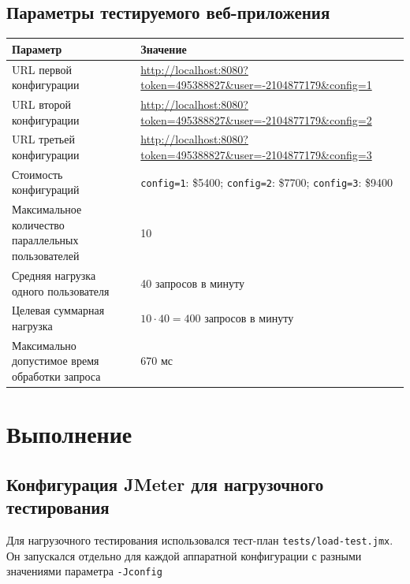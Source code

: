 \documentclass[12pt,a4paper]{report}
\begin{document}
\subsection*{Параметры тестируемого веб-приложения}
\begin{longtable}{|p{3.8cm}|p{10.7cm}|}
\hline
\textbf{Параметр} & \textbf{Значение} \\
\hline
URL первой конфигурации & \url{http://localhost:8080?token=495388827&user=-2104877179&config=1} \\
\hline
URL второй конфигурации & \url{http://localhost:8080?token=495388827&user=-2104877179&config=2} \\
\hline
URL третьей конфигурации & \url{http://localhost:8080?token=495388827&user=-2104877179&config=3} \\
\hline
Стоимость конфигураций & \texttt{config=1}: \$5400; \texttt{config=2}: \$7700; \texttt{config=3}: \$9400 \\
\hline
Максимальное количество параллельных пользователей & 10 \\
\hline
Средняя нагрузка одного пользователя & 40 запросов в минуту \\
\hline
Целевая суммарная нагрузка & $10 \cdot 40 = 400$ запросов в минуту \\
\hline
Максимально допустимое время обработки запроса & 670 мс \\
\hline
\end{longtable}

\newpage
\section*{Выполнение}
\subsection*{Конфигурация JMeter для нагрузочного тестирования}
Для нагрузочного тестирования использовался тест-план \texttt{tests/load-test.jmx}. Он запускался отдельно для каждой аппаратной конфигурации с разными значениями параметра \texttt{-Jconfig}
\end{document}
